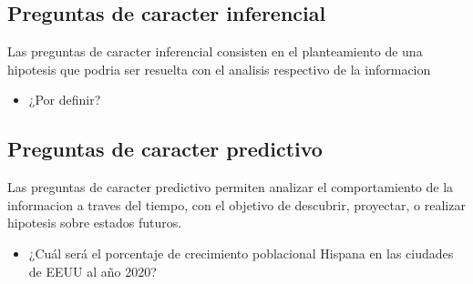   \subsection{Preguntas de caracter inferencial}
   Las preguntas de caracter inferencial consisten en el planteamiento de una hipotesis que podria ser resuelta con el analisis respectivo de la informacion
  \begin{itemize}
   \item ¿Por definir?
  \end{itemize}
  \subsection{Preguntas de caracter predictivo}
   Las preguntas de caracter predictivo permiten analizar el comportamiento de la informacion a traves del tiempo, con el objetivo de descubrir, proyectar, o realizar hipotesis sobre estados futuros.
	\begin{itemize}
		\item ¿Cuál será el porcentaje de crecimiento poblacional Hispana en las ciudades de EEUU al año 2020?
	\end{itemize}